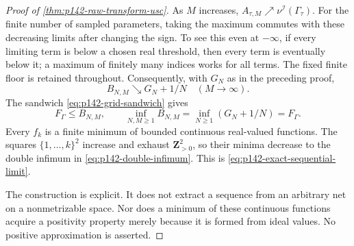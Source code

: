 \begin{proof}[Proof of \cref{thm:p142-raw-transform-usc}]
As $M$ increases, $A_{\tau,M}\nearrow\nu^{\mathcal I}(\Gamma_\tau)$.
For the finite number of sampled parameters, taking the maximum commutes
with these decreasing limits after changing the sign. To see this even
at $-\infty$, if every limiting term is below a chosen real threshold,
then every term is eventually below it; a maximum of finitely many
indices works for all terms. The fixed finite floor is retained throughout.
Consequently, with $G_N$ as in the preceding proof,
\[
           B_{N,M}\searrow G_N+1/N\quad(M\to\infty).
\]
The sandwich \eqref{eq:p142-grid-sandwich} gives
\begin{equation}
 F_\Gamma\leq B_{N,M},\qquad
 \inf_{N,M\geq1}B_{N,M}
      =\inf_{N\geq1}(G_N+1/N)=F_\Gamma.
 \label{eq:p142-double-infimum}
\end{equation}
Every $f_k$ is a finite minimum of bounded continuous real-valued
functions. The squares $\{1,\ldots,k\}^2$ increase and exhaust
$\mathbf Z_{>0}^2$, so their minima decrease to the double infimum
in \eqref{eq:p142-double-infimum}. This is
\eqref{eq:p142-exact-sequential-limit}.

The construction is explicit. It does not extract a sequence from an
arbitrary net on a nonmetrizable space. Nor does a minimum of these
continuous functions acquire a positivity property merely because it
is formed from ideal values. No positive approximation is asserted.
\end{proof}

